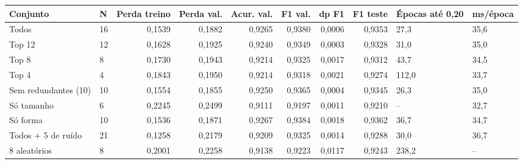 \begin{tabular}{llrrrrrrll}
\toprule
Conjunto & N & Perda treino & Perda val. & Acur. val. & F1 val. & dp F1 & F1 teste & Épocas até 0,20 & ms/época \\
\midrule
Todos & 16 & 0,1539 & 0,1882 & 0,9265 & 0,9380 & 0,0006 & 0,9353 & 27,3 & 35,6 \\
Top 12 & 12 & 0,1628 & 0,1925 & 0,9240 & 0,9349 & 0,0003 & 0,9328 & 31,0 & 35,0 \\
Top 8 & 8 & 0,1730 & 0,1943 & 0,9214 & 0,9325 & 0,0017 & 0,9312 & 43,7 & 34,5 \\
Top 4 & 4 & 0,1843 & 0,1950 & 0,9214 & 0,9318 & 0,0021 & 0,9274 & 112,0 & 33,7 \\
Sem redundantes (10) & 10 & 0,1554 & 0,1855 & 0,9250 & 0,9365 & 0,0004 & 0,9345 & 26,3 & 35,0 \\
Só tamanho & 6 & 0,2245 & 0,2499 & 0,9111 & 0,9197 & 0,0011 & 0,9210 & -- & 32,7 \\
Só forma & 10 & 0,1536 & 0,1871 & 0,9267 & 0,9384 & 0,0018 & 0,9362 & 36,7 & 34,7 \\
Todos + 5 de ruído & 21 & 0,1258 & 0,2179 & 0,9209 & 0,9325 & 0,0014 & 0,9288 & 30,0 & 36,7 \\
8 aleatórios & 8 & 0,2001 & 0,2258 & 0,9138 & 0,9223 & 0,0117 & 0,9243 & 238,2 & -- \\
\bottomrule
\end{tabular}
